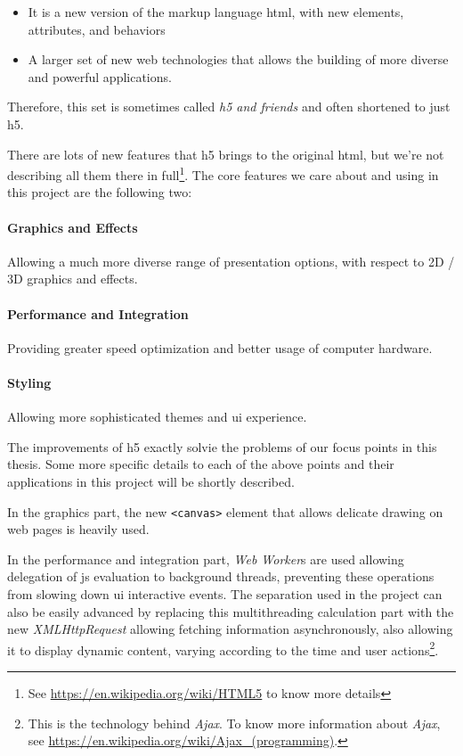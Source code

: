 \begin{itemize}
    \item It is a new version of the markup language \gls{html}, with new elements, attributes, and behaviors
    \item A larger set of new web technologies that allows the building of more diverse and powerful applications.
\end{itemize}

Therefore, this set is sometimes called \emph{\gls{h5} and friends} and often shortened to just \gls{h5}.

There are lots of new features that \gls{h5} brings to the original \gls{html}, but we're not describing all them there in full\footnote{ See \url{https://en.wikipedia.org/wiki/HTML5} to know more details}. The core features we care about and using in this project are the following two:

\paragraph{Graphics and Effects} Allowing a much more diverse range of presentation options, with respect to 2D / 3D graphics and effects.
\paragraph{Performance and Integration} Providing greater speed optimization and better usage of computer hardware.
\paragraph{Styling} Allowing more sophisticated themes and \gls{ui} experience.

The improvements of \gls{h5} exactly solvie the problems of our focus points in this thesis. Some more specific details to each of the above points and their applications in this project will be shortly described.

In the graphics part, the new \texttt{<canvas>} element that allows delicate drawing on web pages is heavily used. 

In the performance and integration part, \emph{Web Worker}s are used allowing delegation of \gls{js} evaluation to background threads, preventing these operations from slowing down \gls{ui} interactive events. The separation used in the project can also be easily advanced by replacing this multithreading calculation part with the new \emph{XMLHttpRequest} allowing fetching information asynchronously, also allowing it to display dynamic content, varying according to the time and user actions\footnote{ This is the technology behind \emph{Ajax}. To know more information about \emph{Ajax}, see \url{https://en.wikipedia.org/wiki/Ajax_(programming)}.}. 

